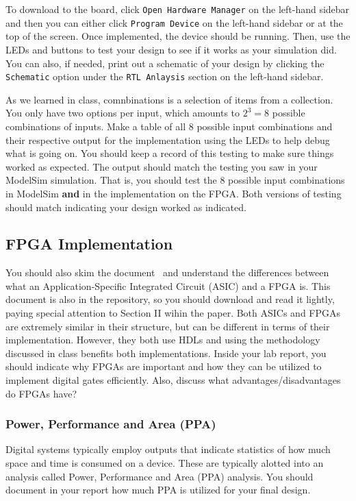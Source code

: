 \documentclass{article}
\begin{document}
To download to the board, click \verb!Open Hardware Manager! on the
left-hand sidebar and then you can either click \verb!Program Device!
on the left-hand sidebar or at the top of the screen.
Once implemented, the device should be running.
Then, use the LEDs and buttons to test
your design to see if it works as your simulation did.  You can also,
if needed, print out a schematic of your design by clicking the
\verb!Schematic! option under the \verb!RTL Anlaysis! section on the
left-hand sidebar.

As we learned in class, comnbinations is a selection of items from a
collection.  You only have two options per input, which amounts to
$2^3 = 8$ possible combinations of inputs.  Make a table of all $8$
possible input combinations and their respective output for the
implementation using the LEDs to help debug what is going on.  You
should keep a record of this testing to make sure things worked as
expected.  The output should match the testing you saw in your
ModelSim simulation.  That is, you should test the $8$ possible input
combinations in ModelSim \textbf{and} in the implementation on the
FPGA. Both versions of testing should match indicating your design
worked as indicated.

\subsection{FPGA Implementation}

You should also skim the document~\cite{7086413} and understand the
differences between what an Application-Specific Integrated Circuit
(ASIC) and a FPGA is.  This document is also in the repository,
so you should download and read it lightly, paying special
attention to Section II wihin the paper.
Both ASICs and FPGAs are extremely similar in
their structure, but can be different in terms of
their implementation.  However, they both use HDLs and using the
methodology discussed in class benefits both implementations.
Inside your lab report, you
should indicate why FPGAs are important and how they can be utilized
to implement digital gates efficiently.  Also, discuss what
advantages/disadvantages do FPGAs have?

\subsubsection{Power, Performance and Area (PPA)}

Digital systems typically employ outputs that indicate statistics of
how much space and time is consumed on a device.  These are typically
alotted into an analysis called Power, Performance and Area (PPA)
analysis.  You should document in your report how much PPA is utilized
for your final design.
\end{document}
